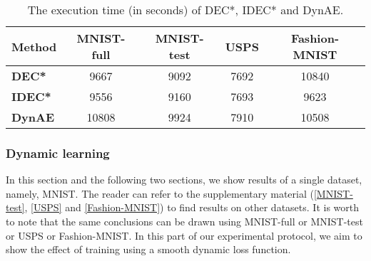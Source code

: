 \documentclass{article}
\begin{document}
\begin{table}[h!]
  \caption{The execution time (in seconds) of DEC*, IDEC* and DynAE.}
  \vskip 0.1in
  \begin{center}
  \begin{small}
  \begin{tabular}{|p{2.2cm}|c|c|c|c|}
    \hline
    {\textbf{Method}} & {\textbf{MNIST-full}} & {\textbf{MNIST-test}} & {\textbf{USPS}} &{\textbf{Fashion-MNIST}}  \\ \hline
    \textbf{DEC*} & 9667 & 9092 & 7692 & 10840 \\ \hline
    \textbf{IDEC*} & 9556 & 9160 & 7693 & 9623 \\ \hline
    \textbf{DynAE} & 10808 & 9924 & 7910 & 10508 \\ \hline 
  \end{tabular}
  \label{table:fair_exec_time}
  \end{small}
  \end{center}
  \vskip 0.1in
\end{table}

\subsubsection{Dynamic learning}
\label{Sec:Dynamic learning}
In this section and the following two sections, we show results of a single dataset, namely, MNIST. The reader can refer to the supplementary material (\ref{MNIST-test}, \ref{USPS} and \ref{Fashion-MNIST}) to find results on other datasets. It is worth to note that the same conclusions can be drawn using MNIST-full or MNIST-test or USPS or Fashion-MNIST. In this part of our experimental protocol, we aim to show the effect of training using a smooth dynamic loss function. 
\end{document}
